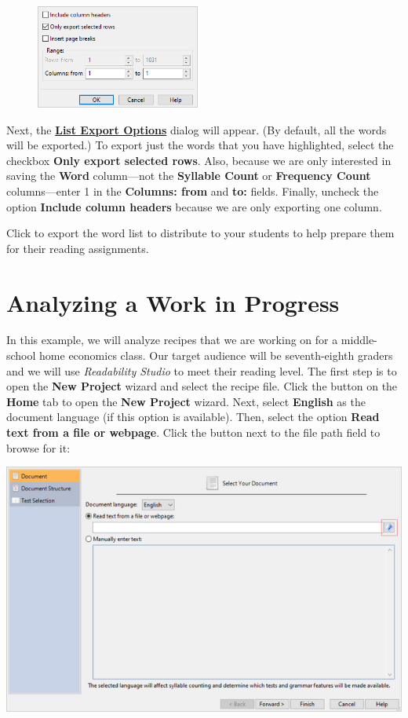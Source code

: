 \documentclass[
]{book}
\theoremstyle{definition}
\theoremstyle{definition}
\theoremstyle{definition}
\theoremstyle{definition}
\theoremstyle{remark}
\begin{document}
\begin{figure}
\includegraphics[width=0.48\textwidth,height=\textheight]{Images/exportoptions.png}

\end{figure}

Next, the \protect\hyperlink{export-list}{\textbf{List Export Options}} dialog will appear. (By default, all the words will be exported.) To export just the words that you have highlighted, select the checkbox \textbf{Only export selected rows}. Also, because we are only interested in saving the \textbf{Word} column---not the \textbf{Syllable Count} or \textbf{Frequency Count} columns---enter 1 in the \textbf{Columns: from} and \textbf{to:} fields. Finally, uncheck the option \textbf{Include column headers} because we are only exporting one column.

Click  to export the word list to distribute to your students to help prepare them for their reading assignments.

\newpage

\hypertarget{analyzing-a-work-in-progress}{%
\section{Analyzing a Work in Progress}\label{analyzing-a-work-in-progress}}

In this example, we will analyze recipes that we are working on for a middle-school home economics class. Our target audience will be seventh-eighth graders and we will use \emph{Readability Studio} to meet their reading level. The first step is to open the \textbf{New Project} wizard and select the recipe file. Click the  button on the \textbf{Home} tab to open the \textbf{New Project} wizard. Next, select \textbf{English} as the document language (if this option is available). Then, select the option \textbf{Read text from a file or webpage}. Click the button next to the file path field to browse for it:

\includegraphics{Images/exampleselectfile.png}
\end{document}

